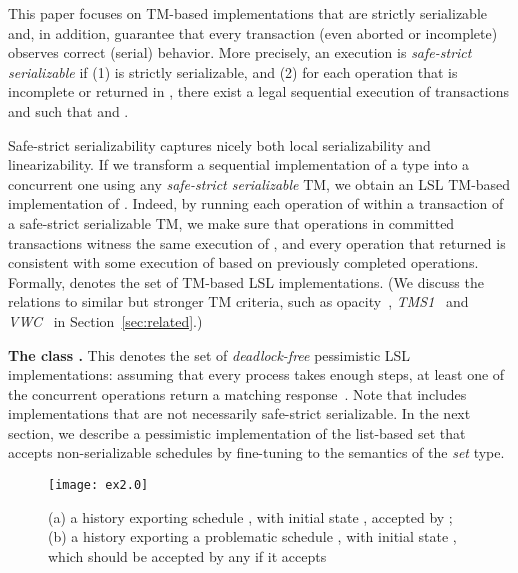 \documentclass[11pt,pdftex,letterpaper]{article}
\begin{document}
This paper focuses on TM-based implementations that are strictly
serializable and, in addition, guarantee that every
transaction (even aborted or incomplete) observes correct (serial)
behavior.  
More precisely, an execution  is  \emph{safe-strict serializable} if
(1)  is strictly serializable, and
(2) for each operation  that is incomplete or returned  in
, there exist a legal sequential execution of transactions
 and
 such that  and .

Safe-strict serializability captures nicely both local serializability
and linearizability. 
If we transform a sequential implementation
 of a type  into a concurrent one using any
\emph{safe-strict serializable} TM, 
we obtain an LSL TM-based
implementation of . 
Indeed, by running each operation of  within a transaction of
a safe-strict serializable TM, we make sure that operations in 
committed transactions witness the same execution of , and
every operation that returned  is consistent with some
execution of  based on previously completed operations.
Formally,  denotes the set of TM-based LSL
implementations.
(We discuss the relations to similar but stronger TM criteria, such as
opacity~\cite{tm-book}, \emph{TMS1}~\cite{TMS09} and
\emph{VWC}~\cite{damien-vw} in Section~\ref{sec:related}.)   

\vspace{1mm}\noindent\textbf{The class .}
This denotes the set of \emph{deadlock-free} pessimistic
LSL implementations: assuming that every process takes
enough steps, 
at least one of the concurrent operations return a matching response~\cite{HS11-progress}.
Note that  includes implementations that are not necessarily safe-strict serializable. 
In the next section, we describe a pessimistic implementation of the list-based set that accepts non-serializable schedules by
fine-tuning to the semantics of the \emph{set} type.
\begin{figure*}
 \texttt{[image: ex2.0]}
 \caption{\small{(a) a history exporting schedule , with initial state
   , accepted by ; 
(b) a history exporting a problematic schedule , with initial state 
   , which should be accepted by any  if it accepts }}\label{fig:ex2}\vspace{-0.35mm}
\end{figure*}
\end{document}
